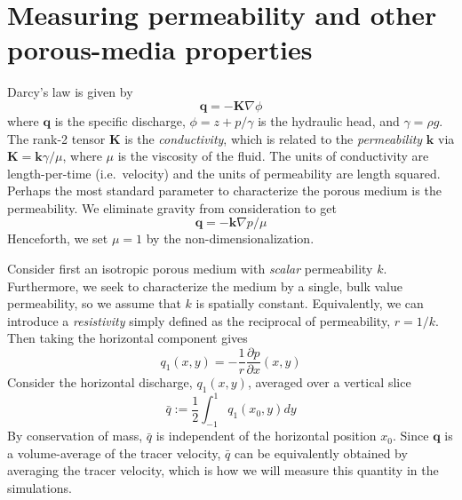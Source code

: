\documentclass[preprint, superscriptaddress, notitlepage]{revtex4-1}
\newcommand{\grad}{{\nabla}}
\newcommand{\pderiv}[2]{\frac{\partial #1}{\partial #2}}
\newcommand{\bvec}[1]{\ensuremath{\boldsymbol{#1}}}
\newcommand {\bq} {\bvec{q}}
\newcommand{\qavg}{\bar{q}}
\begin{document}
\section{Measuring permeability and other porous-media properties}
\label{sec:}
Darcy's law is given by
\begin{equation}
\bq = - \bvec{K} \grad \phi
\end{equation}
where $\bq$ is the specific discharge, $\phi = z + p/\gamma$ is the hydraulic head, and $\gamma = \rho g$. The rank-2 tensor $\bvec{K}$ is the {\em conductivity}, which is related to the {\em permeability} $\bvec{k}$ via $\bvec{K} = \bvec{k} \gamma/\mu$, where $\mu$ is the viscosity of the fluid. The units of conductivity are length-per-time (i.e.~velocity) and the units of permeability are length squared.
Perhaps the most standard parameter to characterize the porous medium is the permeability. We eliminate gravity from consideration to get
\begin{equation}
\bq = - \bvec{k} \grad p / \mu
\end{equation}
Henceforth, we set $\mu = 1$ by the non-dimensionalization.

Consider first an isotropic porous medium with {\em scalar} permeability $k$. Furthermore, we seek to characterize the medium by a single, bulk value permeability, so we assume that $k$ is spatially constant.
Equivalently, we can introduce a {\em resistivity} simply defined as the reciprocal of permeability, $r = 1/k$. Then taking the horizontal component gives
\begin{equation}
\label{q1}
q_1(x,y) = -\frac{1}{r} \pderiv{p}{x}(x,y)
\end{equation}
Consider the horizontal discharge, $q_1(x,y)$, averaged over a vertical slice
\begin{equation}
\qavg := \frac{1}{2} \int_{-1}^{1} q_1(x_0, y) dy
\end{equation}
By conservation of mass, $\qavg$ is independent of the horizontal position $x_0$. Since $\bq$ is a volume-average of the tracer velocity, $\qavg$ can be equivalently obtained by averaging the tracer velocity, which is how we will measure this quantity in the simulations.
\end{document}
